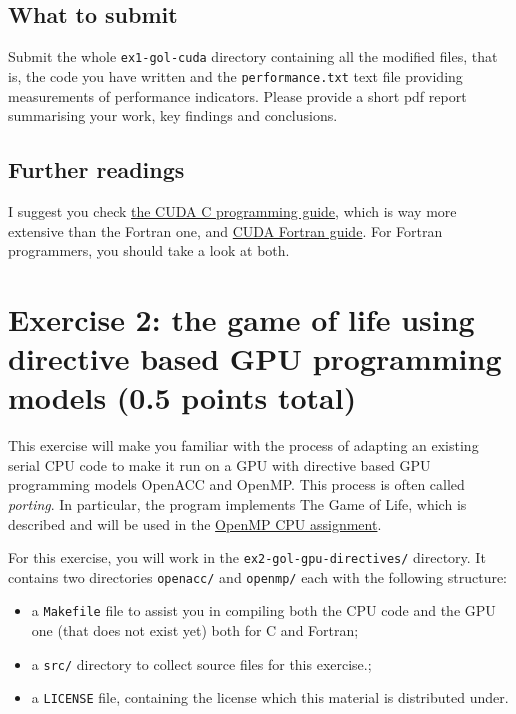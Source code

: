 \documentclass[a4paper, 11pt]{article}
\begin{document}
\subsection{What to submit}
Submit the whole \texttt{ex1-gol-cuda} directory containing all the modified files, that is, the code you have written and the \texttt{performance.txt} text file providing measurements of performance indicators. Please provide a short pdf report summarising your work, key findings and conclusions. 

\subsection{Further readings}

I suggest you check \href{https://docs.nvidia.com/cuda/cuda-c-programming-guide/index.html}{the CUDA C programming guide}, which is way more extensive than the Fortran one, and \href{https://www.pgroup.com/resources/docs/20.4/pdf/pgi20cudaforug.pdf}{CUDA Fortran guide}. For Fortran programmers, you should take a look at both.

\section{Exercise 2: the game of life using directive based GPU programming models (0.5 points total)}
   
        This exercise will make you familiar with the process of adapting an existing serial CPU code to make it run on a GPU with directive based GPU programming models OpenACC and OpenMP. This process is often called \textit{porting}. In particular, the program implements The Game of Life, which is described and will be used in the \href{https://internal.pawsey.org.au/share/s/Cc3Tm7DDR_Srd2YjUrTusw}{OpenMP CPU assignment}.

        For this exercise, you will work in the \texttt{ex2-gol-gpu-directives/} directory. It contains two directories \texttt{openacc/} and \texttt{openmp/} each with the following structure:
        \begin{itemize}
                \item a \texttt{Makefile} file to assist you in compiling both the CPU code and the GPU one (that does not exist yet) both for C and Fortran;
                \item a \texttt{src/} directory to collect source files for this exercise.;
                \item a \texttt{LICENSE} file, containing the license which this material is distributed under.
        \end{itemize}
\end{document}
